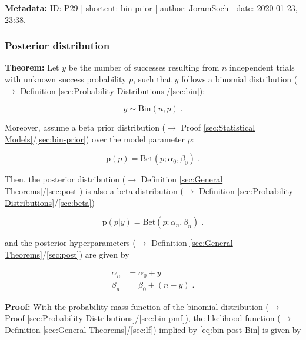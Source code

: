 \documentclass[a4paper,12pt,twoside]{book}
\begin{document}
\vspace{1em}
\textbf{Metadata:} ID: P29 | shortcut: bin-prior | author: JoramSoch | date: 2020-01-23, 23:38.
\vspace{1em}



\subsubsection[\textbf{Posterior distribution}]{Posterior distribution} \label{sec:bin-post}
\setcounter{equation}{0}

\textbf{Theorem:} Let $y$ be the number of successes resulting from $n$ independent trials with unknown success probability $p$, such that $y$ follows a binomial distribution ($\rightarrow$ Definition \ref{sec:Probability Distributions}/\ref{sec:bin}):

\begin{equation} \label{eq:bin-post-Bin}
y \sim \mathrm{Bin}(n,p) \; .
\end{equation}

Moreover, assume a beta prior distribution ($\rightarrow$ Proof \ref{sec:Statistical Models}/\ref{sec:bin-prior}) over the model parameter $p$:

\begin{equation} \label{eq:bin-post-Bin-prior}
\mathrm{p}(p) = \mathrm{Bet}(p; \alpha_0, \beta_0) \; .
\end{equation}

Then, the posterior distribution ($\rightarrow$ Definition \ref{sec:General Theorems}/\ref{sec:post}) is also a beta distribution ($\rightarrow$ Definition \ref{sec:Probability Distributions}/\ref{sec:beta})

\begin{equation} \label{eq:bin-post-Bin-post}
\mathrm{p}(p|y) = \mathrm{Bet}(p; \alpha_n, \beta_n) \; .
\end{equation}

and the posterior hyperparameters ($\rightarrow$ Definition \ref{sec:General Theorems}/\ref{sec:post}) are given by

\begin{equation} \label{eq:bin-post-Bin-post-par}
\begin{split}
\alpha_n &= \alpha_0 + y \\
\beta_n &= \beta_0 + (n-y) \; .
\end{split}
\end{equation}


\vspace{1em}
\textbf{Proof:} With the probability mass function of the binomial distribution ($\rightarrow$ Proof \ref{sec:Probability Distributions}/\ref{sec:bin-pmf}), the likelihood function ($\rightarrow$ Definition \ref{sec:General Theorems}/\ref{sec:lf}) implied by \eqref{eq:bin-post-Bin} is given by
\end{document}
